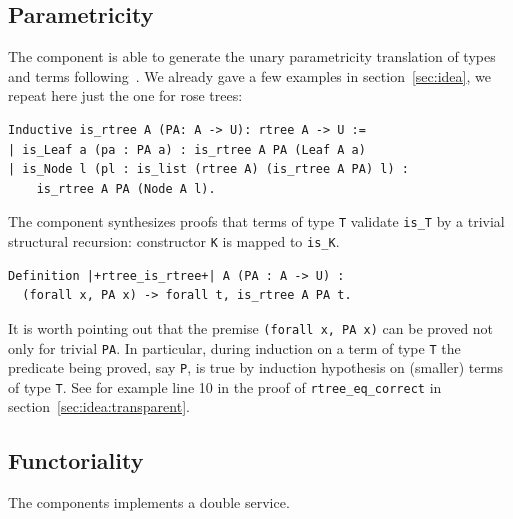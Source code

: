 \documentclass[sigplan,10pt,review]{acmart}\settopmatter{printfolios=true,printccs=false,printacmref=false}
\newcommand{\derive}[1]{\keys{#1}}
\begin{document}
\subsection{Parametricity} %

The \derive{pram1} component is able to generate the unary
parametricity translation of types and terms
following~\cite{keller:hal-00730913}. We already gave a few
examples in section~\ref{sec:idea}, we repeat here just the
one for rose trees:

\begin{minipage}{\textwidth}\begin{lstlisting}
Inductive is_rtree A (PA: A -> U): rtree A -> U :=
| is_Leaf a (pa : PA a) : is_rtree A PA (Leaf A a)
| is_Node l (pl : is_list (rtree A) (is_rtree A PA) l) :
    is_rtree A PA (Node A l).
\end{lstlisting}\end{minipage}

\noindent
The \derive{pram1P} component synthesizes proofs that terms
of type \lstinline+T+ validate \lstinline+is_T+ by a trivial
structural recursion: constructor \lstinline+K+ is mapped
to \lstinline+is_K+.

\begin{minipage}{\textwidth}\begin{lstlisting}
Definition |+rtree_is_rtree+| A (PA : A -> U) :
  (forall x, PA x) -> forall t, is_rtree A PA t.
\end{lstlisting}\end{minipage}

\noindent
It is worth pointing out that the premise
\lstinline+(forall x, PA x)+ can be proved not only for
trivial \lstinline+PA+. In particular, during induction
on a term of type \lstinline+T+ the predicate being
proved, say \lstinline+P+, is true by induction hypothesis
on (smaller) terms of type \lstinline+T+. See for example
line 10 in the proof of \lstinline+rtree_eq_correct+ in
section~\ref{sec:idea:transparent}.


\subsection{Functoriality} %

The \derive{map} components implements a double service.
\end{document}
